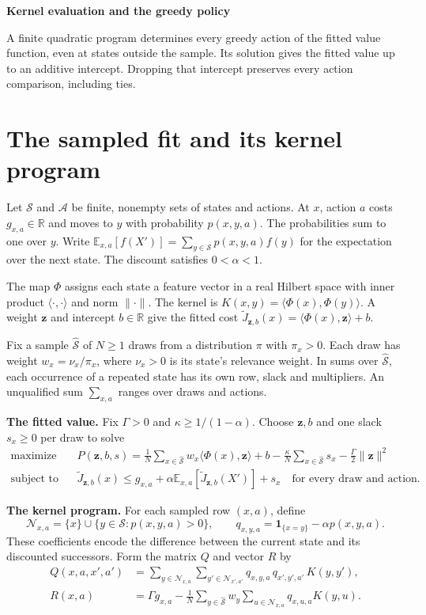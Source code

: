 \documentclass[12pt,a4paper]{article}
\newcommand{\ip}[2]{\langle #1,#2\rangle}
\newcommand{\norm}[1]{\lVert #1\rVert}
\newcommand{\R}{\mathbb R}
\newcommand{\E}{\mathbb E}
\newcommand{\N}{\mathcal N}
\newcommand{\lead}[1]{\par\smallskip\noindent\textbf{#1}\enspace}
\begin{document}
{\LARGE\bfseries Kernel evaluation and the greedy policy\par}
\medskip
A finite quadratic program determines every greedy action of the fitted
value function, even at states outside the sample. Its solution gives the
fitted value up to an additive intercept. Dropping that intercept preserves
every action comparison, including ties.

\section*{The sampled fit and its kernel program}
Let \(\mathcal S\) and \(\mathcal A\) be finite, nonempty sets of states and
actions. At \(x\), action \(a\) costs \(g_{x,a}\in\R\) and moves to \(y\) with
probability \(p(x,y,a)\). The probabilities sum to one over \(y\). Write
\(\E_{x,a}[f(X')]=\sum_{y\in\mathcal S}p(x,y,a)f(y)\) for the expectation
over the next state. The discount satisfies \(0<\alpha<1\).

The map \(\Phi\) assigns each state a feature vector in a real Hilbert
space with inner product \(\ip{\cdot}{\cdot}\) and norm \(\norm{\cdot}\).
The kernel is \(K(x,y)=\ip{\Phi(x)}{\Phi(y)}\). A weight \(\mathbf z\)
and intercept \(b\in\R\) give the fitted cost
\(\widetilde J_{\mathbf z,b}(x)=\ip{\Phi(x)}{\mathbf z}+b\).

Fix a sample \(\widehat{\mathcal S}\) of \(N\ge1\) draws from a distribution
\(\pi\) with \(\pi_x>0\). Each draw has weight \(w_x=\nu_x/\pi_x\), where
\(\nu_x>0\) is its state's relevance weight. In sums over
\(\widehat{\mathcal S}\), each occurrence of a repeated state has its own
row, slack and multipliers. An unqualified sum \(\sum_{x,a}\) ranges
over draws and actions.

\lead{The fitted value.} Fix \(\Gamma>0\) and \(\kappa\ge 1/(1-\alpha)\).
Choose \(\mathbf z,b\) and one slack \(s_x\ge0\) per draw to solve
\[
\begin{aligned}
 \text{maximize}\quad &P(\mathbf z,b,s)=
  \frac1N\sum_{x\in\widehat{\mathcal S}}w_x\ip{\Phi(x)}{\mathbf z}+b
  -\frac{\kappa}{N}\sum_{x\in\widehat{\mathcal S}}s_x
  -\frac{\Gamma}{2}\norm{\mathbf z}^2\\
 \text{subject to}\quad&
 \widetilde J_{\mathbf z,b}(x)\le g_{x,a}+
   \alpha\E_{x,a}[\widetilde J_{\mathbf z,b}(X')]+s_x
 \quad\text{for every draw and action.}
\end{aligned}
\tag{P}
\]

\lead{The kernel program.} For each sampled row \((x,a)\), define
\[
 \N_{x,a}=\{x\}\cup\{y\in\mathcal S:p(x,y,a)>0\},\qquad
 q_{x,y,a}=\mathbf 1_{\{x=y\}}-\alpha p(x,y,a).
\]
These coefficients encode the difference between the current state and
its discounted successors. Form the matrix \(Q\) and vector \(R\) by
\begin{align}
 Q(x,a,x',a')&=
   \sum_{y\in\N_{x,a}}\sum_{y'\in\N_{x',a'}}
   q_{x,y,a}\,q_{x',y',a'}\,K(y,y'),\label{eq:Q}\\
 R(x,a)&=\Gamma g_{x,a}-
   \frac1N\sum_{y\in\widehat{\mathcal S}}w_y
          \sum_{u\in\N_{x,a}}q_{x,u,a}K(y,u).\label{eq:R}
\end{align}
\end{document}
